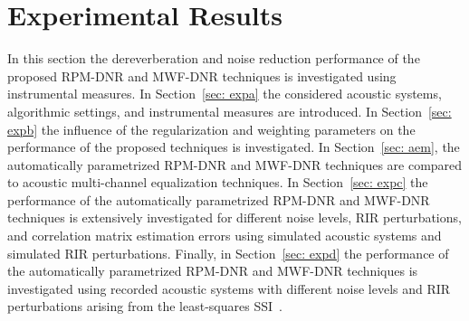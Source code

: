 \documentclass[10pt]{IEEEtran}
\begin{document}

\section{Experimental Results}
\label{sec: exp}
In this section the dereverberation and noise reduction performance of the proposed RPM-DNR and MWF-DNR techniques is investigated using instrumental measures.
In Section~\ref{sec: expa} the considered acoustic systems, algorithmic settings, and instrumental measures are introduced. 
In Section~\ref{sec: expb} the influence of the regularization and weighting parameters on the performance of the proposed techniques is investigated.
In Section~\ref{sec: aem}, the automatically parametrized RPM-DNR and MWF-DNR techniques are compared to acoustic multi-channel equalization techniques.
In Section~\ref{sec: expc} the performance of the automatically parametrized RPM-DNR and MWF-DNR techniques is extensively investigated for different noise levels, RIR perturbations, and correlation matrix estimation errors using simulated acoustic systems and simulated RIR perturbations.
Finally, in Section~\ref{sec: expd} the performance of the automatically parametrized RPM-DNR and MWF-DNR techniques is investigated using recorded acoustic systems with different noise levels and RIR perturbations arising from the least-squares SSI~\cite{Lim_ITASLP_2014}.
\end{document}
